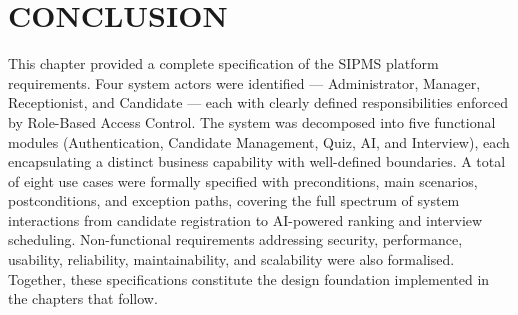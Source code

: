 \section{CONCLUSION}
This chapter provided a complete specification of the SIPMS platform requirements. Four system actors were identified — Administrator, Manager, Receptionist, and Candidate — each with clearly defined responsibilities enforced by Role-Based Access Control. The system was decomposed into five functional modules (Authentication, Candidate Management, Quiz, AI, and Interview), each encapsulating a distinct business capability with well-defined boundaries. A total of eight use cases were formally specified with preconditions, main scenarios, postconditions, and exception paths, covering the full spectrum of system interactions from candidate registration to AI-powered ranking and interview scheduling. Non-functional requirements addressing security, performance, usability, reliability, maintainability, and scalability were also formalised. Together, these specifications constitute the design foundation implemented in the chapters that follow.
